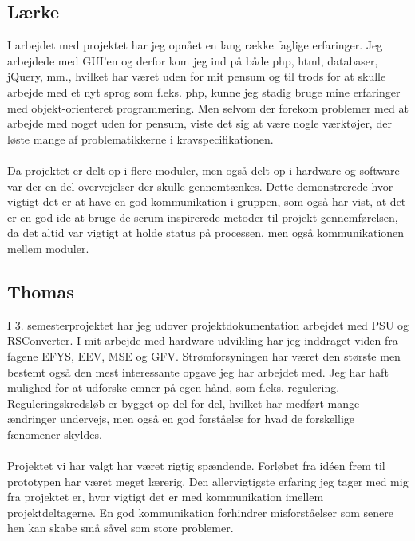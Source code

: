 \subsection{Lærke}
I arbejdet med projektet har jeg opnået en lang række faglige erfaringer. Jeg arbejdede med GUI'en og derfor kom jeg ind på både php, html, databaser, jQuery, mm., hvilket har været uden for mit pensum og til trods for at skulle arbejde med et nyt sprog som f.eks. php, kunne jeg stadig bruge mine erfaringer med objekt-orienteret programmering. Men selvom der forekom problemer med at arbejde med noget uden for pensum, viste det sig at være nogle værktøjer, der løste mange af problematikkerne i kravspecifikationen.
\\\\
Da projektet er delt op i flere moduler, men også delt op i hardware og software var der en del overvejelser der skulle gennemtænkes. Dette demonstrerede hvor vigtigt det er at have en god kommunikation i gruppen, som også har vist, at det er en god ide at bruge de scrum inspirerede metoder til projekt gennemførelsen, da det altid var vigtigt at holde status på processen, men også kommunikationen mellem moduler. 

\subsection{Thomas}
I 3. semesterprojektet har jeg udover projektdokumentation arbejdet med PSU og RSConverter. I mit arbejde med hardware udvikling har jeg inddraget viden fra fagene EFYS, EEV, MSE og GFV. Strømforsyningen har været den største men bestemt også den mest interessante opgave jeg har arbejdet med. Jeg har haft mulighed for at udforske emner på egen hånd, som f.eks. regulering. Reguleringskredsløb er bygget op del for del, hvilket har medført mange ændringer undervejs, men også en god forståelse for hvad de forskellige fænomener skyldes.
\\\\
Projektet vi har valgt har været rigtig spændende. Forløbet fra idéen frem til prototypen har været meget lærerig. Den allervigtigste erfaring jeg tager med mig fra projektet er, hvor vigtigt det er med kommunikation imellem projektdeltagerne. En god kommunikation forhindrer misforståelser som senere hen kan skabe små såvel som store problemer.